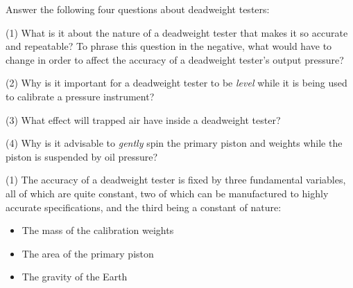 

Answer the following four questions about deadweight testers:


\vskip 10pt {\narrower \noindent \baselineskip5pt

\noindent
(1) What is it about the nature of a deadweight tester that makes it so accurate and repeatable?  To phrase this question in the negative, what would have to change in order to affect the accuracy of a deadweight tester's output pressure?

\par} \vskip 10pt




\vskip 10pt {\narrower \noindent \baselineskip5pt

\noindent
(2) Why is it important for a deadweight tester to be {\it level} while it is being used to calibrate a pressure instrument?

\par} \vskip 10pt



\vskip 10pt {\narrower \noindent \baselineskip5pt

\noindent
(3) What effect will trapped air have inside a deadweight tester?

\par} \vskip 10pt




\vskip 10pt {\narrower \noindent \baselineskip5pt

\noindent
(4) Why is it advisable to {\it gently} spin the primary piston and weights while the piston is suspended by oil pressure?

\par} \vskip 10pt









\vskip 10pt {\narrower \noindent \baselineskip5pt

\noindent
(1) The accuracy of a deadweight tester is fixed by three fundamental variables, all of which are quite constant, two of which can be manufactured to highly accurate specifications, and the third being a constant of nature:

\begin{itemize}
\item{} The mass of the calibration weights
\item{} The area of the primary piston
\item{} The gravity of the Earth
\end{itemize}

\par} \vskip 10pt




